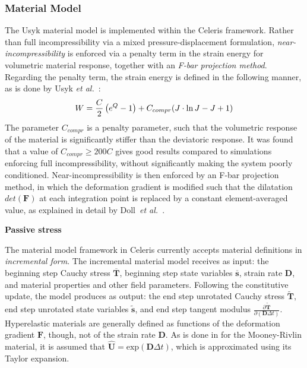 \subsubsection{Material Model}
The Usyk material model is implemented within the Celeris framework. Rather than full incompressibility via a mixed pressure-displacement formulation, \textit{near-incompressibility} is enforced via a penalty term in the strain energy for volumetric material response, together with an \textit{F-bar projection method}. Regarding the penalty term, the strain energy is defined in the following manner, as is done by Usyk \textit{et al.}~\cite{usyk_2002}:
\begin{equation}
W = \frac{C}{2}\left(e^Q -1\right) + C_{compr} (J \cdot \ln J - J + 1) \\
\end{equation}
The parameter $C_{compr}$ is a penalty parameter, such that the volumetric response of the material is significantly stiffer than the deviatoric response. It was found that a value of $C_{compr} \geq 200  C$ gives good results compared to simulations enforcing full incompressibility, without significantly making the system poorly conditioned. Near-incompressibility is then enforced by an F-bar projection method, in which the deformation gradient is modified such that the dilatation $det(\bm{F})$ at each integration point is replaced by a constant element-averaged value, as explained in detail by Doll~\textit{et al.}~\cite{doll_2000}.

\textbf{Passive stress}

The material model framework in Celeris currently accepts material definitions in \textit{incremental form}. The incremental material model receives as input: the beginning step Cauchy stress $\overline{\bm{T}}$, beginning step state variables $\overline{\bm{s}}$, strain rate $\bm{D}$, and material properties and other field parameters. Following the constitutive update, the model produces as output: the end step unrotated Cauchy stress $\tilde{\bm{T}}$, end step unrotated state variables $\tilde{\bm{s}}$, and end step tangent modulus $\frac{\partial \tilde{\bm{T}}}{\partial (\bm{D}\Delta{t})}$. Hyperelastic materials are generally defined as functions of the deformation gradient $\bm{F}$, though, not of the strain rate $\bm{D}$. As is done in  for the Mooney-Rivlin material, it is assumed that $\hat{\bm{U}} = \text{exp}(\bm{D}\Delta{t})$, which is approximated using its Taylor expansion.

